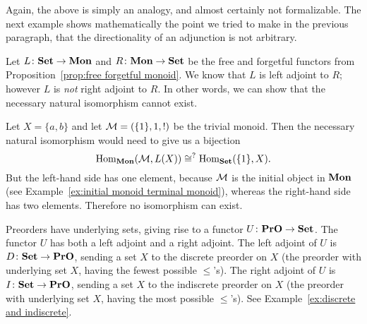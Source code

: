 \documentclass[CT4S-EN-RU]{subfiles}
\begin{document}
\begin{blockRUS}
\end{blockRUS}

\begin{blockENG}
Again, the above is simply an analogy, and almost certainly not formalizable. The next example shows mathematically the point we tried to make in the previous paragraph, that the directionality of an adjunction is not arbitrary.
\end{blockENG}

\begin{blockRUS}
\end{blockRUS}

\begin{exampleENG}\label{ex:adjunction monoids and sets}
Let $L\colon{\mathbf{Set}}\rightarrow{\mathbf{Mon}}$ and $R\colon{\mathbf{Mon}}\rightarrow{\mathbf{Set}}$ be the free and forgetful functors from Proposition~\ref{prop:free forgetful monoid}. We know that $L$ is left adjoint to $R$; however $L$ is {\em not} right adjoint to $R$. In other words, we can show that the necessary natural isomorphism cannot exist.

Let $X=\{a,b\}$ and let $\mathcal{M}=(\{1\},1,!)$ be the trivial monoid. Then the necessary natural isomorphism would need to give us a bijection 
$$\textnormal{Hom}_{\mathbf{Mon}}(\mathcal{M},L(X))\cong^?\textnormal{Hom}_{\mathbf{Set}}(\{1\},X).$$ 
But the left-hand side has one element, because $\mathcal{M}$ is the initial object in ${\mathbf{Mon}}$ (see Example~\ref{ex:initial monoid terminal monoid}), whereas the right-hand side has two elements. Therefore no isomorphism can exist.
\end{exampleENG}

\begin{exampleRUS}\label{ex:adjunction monoids and sets}
\end{exampleRUS}

\begin{exampleENG}
Preorders have underlying sets, giving rise to a functor $U\colon{\mathbf{PrO}}\rightarrow{\mathbf{Set}}$. The functor $U$ has both a left adjoint and a right adjoint. The left adjoint of $U$ is $D\colon{\mathbf{Set}}\rightarrow{\mathbf{PrO}}$, sending a set $X$ to the discrete preorder on $X$ (the preorder with underlying set $X$, having the fewest possible $\leq$'s). The right adjoint of $U$ is $I\colon{\mathbf{Set}}\rightarrow{\mathbf{PrO}}$, sending a set $X$ to the indiscrete preorder on $X$ (the preorder with underlying set $X$, having the most possible $\leq$'s). See Example~\ref{ex:discrete and indiscrete}. 
\end{exampleENG}
\end{document}
